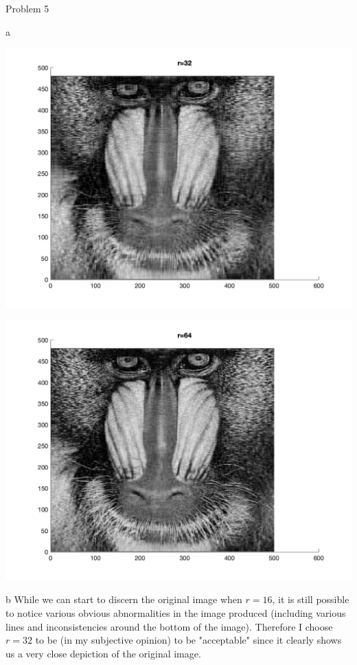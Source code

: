 \begin{section}{Problem 5}
\begin{solution}{a}
        \begin{mdframed}
            \includegraphics[scale=0.33]{DevamSisodraker_5a_32.jpg}
        \end{mdframed}

        \continued

        \begin{mdframed}
            \includegraphics[scale=0.33]{DevamSisodraker_5a_64.jpg}
        \end{mdframed}
    \end{solution}

    \newpage
    
    \begin{solution}{b}
        While we can start to discern the original image when $r = 16$, it is still possible to notice various obvious abnormalities in the image produced (including various lines and inconsistencies around the bottom of the image). Therefore I choose $r = 32$ to be (in my subjective opinion) to be "acceptable" since it clearly shows us a very close depiction of the original image.
    \end{solution}


\end{section}
